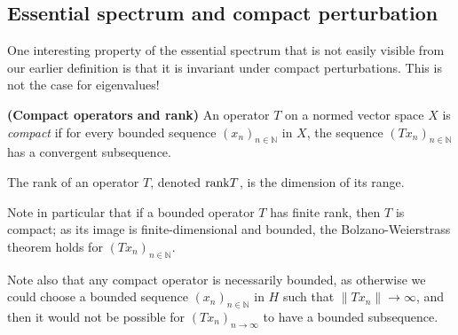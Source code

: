 \documentclass[../main.tex]{subfiles}
\begin{document}
\subsection{Essential spectrum and compact perturbation}
One interesting property of the essential spectrum that is not easily visible from our earlier definition is that it is invariant under compact
perturbations. This is not the case for eigenvalues!

\begin{definition}{\textbf{(Compact operators and rank)}}
An operator $T$ on a normed vector space $X$ is \emph{compact} if for every bounded sequence $(x_n)_{n \in \mathbb{N}}$ in $X$, the sequence $(Tx_n)_{n \in \mathbb{N}}$ has a convergent subsequence.

The rank of an operator $T$, denoted $\mathrm{rank} T$, is the dimension of its range.
\end{definition}

Note in particular that if a bounded operator $T$ has finite rank, then $T$ is compact; as its image is finite-dimensional and bounded, 
the Bolzano-Weierstrass theorem holds for $(Tx_n)_{n \in \mathbb{N}}$.

Note also that any compact operator is necessarily bounded, as otherwise we could choose a bounded sequence $(x_n)_{n \in \mathbb{N}}$ in $H$ such that $\|Tx_n\| \rightarrow \infty$, 
and then it would not be possible for $(Tx_n)_{n \rightarrow \infty}$ to have a bounded subsequence. 
\end{document}
